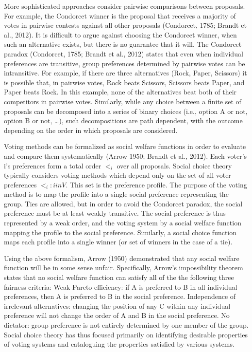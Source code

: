 More sophisticated approaches consider pairwise comparisons between proposals. For example, the Condorcet winner is the proposal that receives a majority of votes in pairwise contests against all other proposals (Condorcet, 1785; Brandt et al., 2012). It is difficult to argue against choosing the Condorcet winner, when such an alternative exists, but there is no guarantee that it will. The Condorcet paradox (Condorcet, 1785; Brandt et al., 2012) states that even when individual preferences are transitive, group preferences determined by pairwise votes can be intransitive. For example, if there are three alternatives (Rock, Paper, Scissors) it is possible that, in pairwise votes, Rock beats Scissors, Scissors beats Paper, and Paper beats Rock. In this example, none of the alternatives beat both of their competitors in pairwise votes. Similarly, while any choice between a finite set of proposals can be decomposed into a series of binary choices (i.e., option A or not, option B or not, …), such decompositions are path dependent, with the outcome depending on the order in which proposals are considered.

Voting methods can be formalized as social welfare functions in order to evaluate and compare them systematically (Arrow 1950; Brandt et al., 2012). Each voter's i's preferences form a total order $<_i$ over all proposals. Social choice theory typically considers voting methods which depend only on the set of all voter preferences ${<_i: i in V}$. This set is the preference profile. The purpose of the voting method is to map the profile into a single social preference representing the group. Ties are allowed, but in order to avoid the Condorcet paradox, the social preference must be at least weakly transitive. The social preference is thus represented by a weak order, and the voting system by a social welfare function mapping the profile to the social preference. Similarly, a social choice function maps each profile into a single winner (or set of winners in the case of a tie).

Using the above formalism, Arrow (1950) demonstrated that any social welfare function will be in some sense unfair. Specifically, Arrow's impossibility theorem states that no social welfare function can satisfy all of the the following three fairness criteria:
Weak Pareto efficiency: if A is preferred to B in all individual preferences, then A is preferred to B in the social preference.
Independence of irrelevant alternatives: changing the position of any C within any individual preference will not change the order of A and B in the social preference.
No dictator: group preference is not entirely determined by one member of the group.
Social choice theory has thus focused primarily on identifying desirable properties of voting systems and cataloguing the properties satisfied by various systems.

